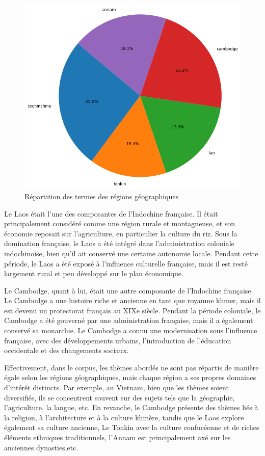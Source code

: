 \begin{figure}[H]
    \centering
    \includegraphics[width=12cm]{img/2.13.mot_geo.png}
    \caption{Répartition des termes des régions géographiques}
    \label{fig:mot_geo}
\end{figure}

Le Laos était l'une des composantes de l'Indochine française. Il était principalement considéré comme une région rurale et montagneuse, et son économie reposait sur l'agriculture, en particulier la culture du riz. Sous la domination française, le Laos a été intégré dans l'administration coloniale indochinoise, bien qu'il ait conservé une certaine autonomie locale. Pendant cette période, le Laos a été exposé à l'influence culturelle française, mais il est resté largement rural et peu développé sur le plan économique.

Le Cambodge, quant à lui, était une autre composante de l'Indochine française. Le Cambodge a une histoire riche et ancienne en tant que royaume khmer, mais il est devenu un protectorat français au XIXe siècle. Pendant la période coloniale, le Cambodge a été gouverné par une administration française, mais il a également conservé sa monarchie. Le Cambodge a connu une modernisation sous l'influence française, avec des développements urbains, l'introduction de l'éducation occidentale et des changements sociaux.

Effectivement, dans le corpus, les thèmes abordés ne sont pas répartis de manière égale selon les régions géographiques, mais chaque région a ses propres domaines d'intérêt distincts. Par exemple, au Vietnam, bien que les thèmes soient diversifiés, ils se concentrent souvent sur des sujets tels que la géographie, l'agriculture, la langue, etc. En revanche, le Cambodge présente des thèmes liés à la religion, à l'architecture et à la culture khmère, tandis que le Laos explore également sa culture ancienne, Le Tonkin avec la culture confucéenne et de riches éléments ethniques traditionnels, l'Annam est principalement axé sur les anciennes dynasties,etc.

